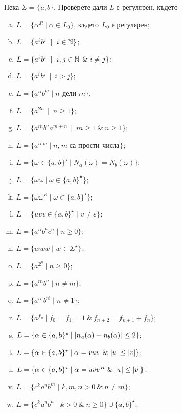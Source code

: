 \begin{problem}
  Нека $\Sigma = \{a,b\}$.  Проверете дали $L$ е регулярен, където
  \begin{enumerate}[a)]
  \item
    $L = \{\alpha^R \mid \alpha \in L_0\}$, където $L_0$ е регулярен;
  \item
    $L = \{a^ib^i\ \mid\ i\in\Nat\}$;
  \item
    $L = \{a^ib^i\ \mid\ i,j\in\Nat\ \&\ i\neq j\}$;
  \item
    $L = \{a^ib^j\ \mid\ i > j\}$;
  \item
    $L = \{a^nb^m \mid n\mbox{ дели }m\}$.
  \item
    $L = \{a^{2n}\ \mid\ n\geq 1\}$;
  \item
    $L = \{a^mb^na^{m+n}\ \mid\ m\geq 1\ \&\ n\geq 1\}$;
  \item
    $L = \{a^{n.m}\mid n,m\mbox{ са прости числа}\}$;
  \item
    $L = \{\omega\in\{a,b\}^\star \mid N_a(\omega) = N_b(\omega)\}$;
  \item
    $L = \{\omega\omega\mid \omega\in\{a,b\}^\star\}$;
  \item
    $L = \{\omega\omega^R\mid \omega\in\{a,b\}^\star\}$;
  \item
    $L = \{uvv \in \{a,b\}^\star\mid v \neq \varepsilon\}$;
  \item
    $L = \{a^nb^nc^n\mid n\geq 0\}$;
  \item
    $L = \{www\mid w\in \Sigma^\star\}$;
  \item
    $L = \{a^{2^n}\mid n\geq 0\}$;
  \item
    $L = \{a^mb^n\mid n\neq m\}$;
  \item
    $L = \{a^{n!}b^{n!}\mid n\neq 1\}$;
  \item
    $L = \{a^{f_n} \mid f_0 = f_1 = 1\ \&\ f_{n+2} = f_{n+1} + f_{n}\}$;
  \item
    $L = \{\alpha \in \{a,b\}^\star \mid \vert{n_a(\alpha) - n_b(\alpha)}\vert \leq 2\}$;
  \item
    $L = \{\alpha \in \{a,b\}^\star \mid \alpha = vuv\ \&\ \vert{u}\vert \leq \vert{v}\vert\}$;
  \item
    $L = \{\alpha \in \{a,b\}^\star \mid \alpha = uvv^R\ \&\ \vert{u}\vert \leq \vert{v}\vert\}$;
  \item
    $L = \{c^ka^nb^m \mid k,m,n > 0\ \&\ n \neq m\}$;
  \item
    $L = \{c^ka^nb^n \mid k > 0\ \&\ n \geq 0\}\cup\{a,b\}^\star$;
  \end{enumerate}
\end{problem}

